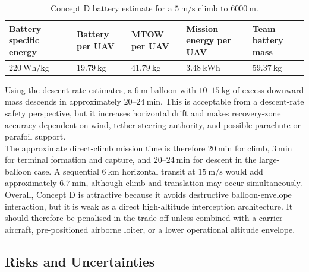 % 
\begin{table}[H]
\centering
\small
\caption{Concept D battery estimate for a $5~\mathrm{m/s}$ climb to $6000~\mathrm{m}$.}
\label{tab:conceptD_battery_mass_estimate}
\setlength{\tabcolsep}{5pt}
\renewcommand{\arraystretch}{1.18}
\begin{tabularx}{0.9\textwidth}{@{}XXXXX@{}}
\toprule
\textbf{Battery specific energy} & 
\textbf{Battery per UAV} & 
\textbf{MTOW per UAV} & 
\textbf{Mission energy per UAV} & 
\textbf{Team battery mass} \\
\midrule
$220~\mathrm{Wh/kg}$ & $19.79~\mathrm{kg}$ & $41.79~\mathrm{kg}$ & $3.48~\mathrm{kWh}$ & $59.37~\mathrm{kg}$ \\
\bottomrule
\end{tabularx}
\end{table}

Using the descent-rate estimates, a \(6~\mathrm{m}\) balloon with \(10\)--\(15~\mathrm{kg}\) of excess downward mass descends in approximately \(20\)--\(24~\mathrm{min}\). This is acceptable from a descent-rate safety perspective, but it increases horizontal drift and makes recovery-zone accuracy dependent on wind, tether steering authority, and possible parachute or parafoil support. \\

The approximate direct-climb mission time is therefore \(20~\mathrm{min}\) for climb, \(3~\mathrm{min}\) for terminal formation and capture, and \(20\)--\(24~\mathrm{min}\) for descent in the large-balloon case. A sequential \(6~\mathrm{km}\) horizontal transit at \(15~\mathrm{m/s}\) would add approximately \(6.7~\mathrm{min}\), although climb and translation may occur simultaneously.\\

Overall, Concept D is attractive because it avoids destructive balloon-envelope interaction, but it is weak as a direct high-altitude interception architecture. It should therefore be penalised in the trade-off unless combined with a carrier aircraft, pre-positioned airborne loiter, or a lower operational altitude envelope.\\







\subsection{Risks and Uncertainties}

